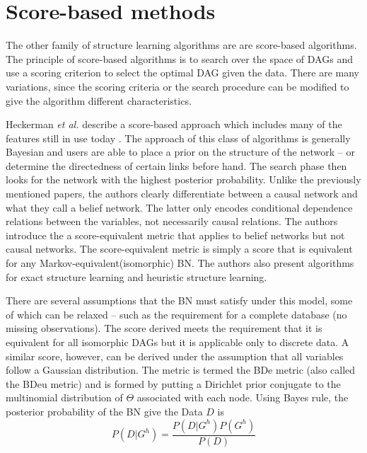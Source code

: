    
  \section{Score-based methods}
  
  The other family of structure learning algorithms are
  are score-based algorithms. The principle of score-based 
  algorithms is to 
  search over the space of DAGs and use a scoring 
  criterion to select the optimal DAG given the data. 
  There are many variations, since the scoring criteria or
  the search procedure can be modified to give the 
  algorithm different characteristics. 

 Heckerman \textit{et al.} describe 
 a score-based approach which includes many of the features
 still in use today \cite{Giovani2014}. 
  The approach of this class of algorithms is 
  generally Bayesian and users are able to place 
  a prior on the structure of the network -- or determine
  the directedness of certain links before hand. The search 
    phase then looks for the network with the
  highest posterior probability. Unlike the previously 
  mentioned papers, the authors clearly differentiate between
  a causal network and what they call a belief network. 
  The latter only encodes conditional dependence relations
  between the variables, not necessarily causal relations. 
  The authors introduce the a score-equivalent metric that 
  applies to belief networks but not causal networks. 
  The score-equivalent metric is simply a score that 
  is equivalent for any Markov-equivalent(isomorphic)
  BN. The authors also present algorithms for exact structure
   learning and heuristic structure learning. 


    There are several assumptions that the BN must
    satisfy under this model, some of which can be 
    relaxed -- such as the requirement for a complete database
    (no missing observations).
    The score derived meets the requirement that it is
     equivalent for all isomorphic DAGs but 
    it is applicable only to discrete data. A similar
    score, however, can be derived under the assumption
    that all variables follow a Gaussian
    distribution. The metric is termed the BDe metric (also 
    called the BDeu metric) and is formed by putting 
    a Dirichlet prior conjugate to the multinomial 
    distribution of $\Theta$ associated 
    with each node. Using Bayes rule, the posterior probability
    of the BN give the Data $D$ is 
    \[
        P(D|G^h) = \frac{P(D|G^h)P(G^h)  }{ P(D) }
    \]

